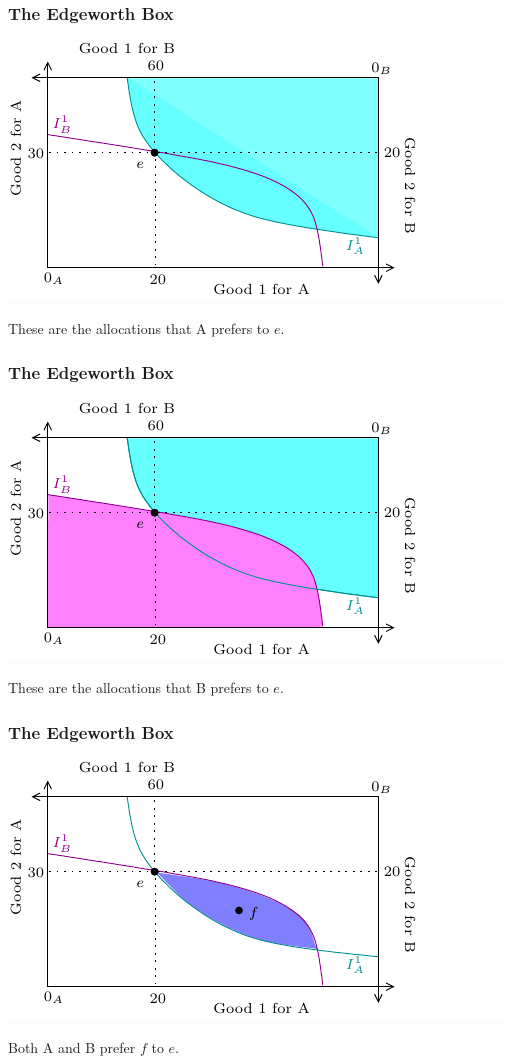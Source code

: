 \documentclass[xcolor=pdftex,dvipsnames]{beamer}
\begin{document}
\begin{frame}
\frametitle{The Edgeworth Box}
\begin{center}
\includegraphics{pics/Edgeworth5}
\end{center}
These are the allocations that A prefers to $e$.
\end{frame}

\begin{frame}
\frametitle{The Edgeworth Box}
\begin{center}
\includegraphics{pics/Edgeworth6}
\end{center}
These are the allocations that B prefers to $e$.
\end{frame}

\begin{frame}
\frametitle{The Edgeworth Box}
\begin{center}
\includegraphics{pics/Edgeworth7}
\end{center}
Both A and B prefer $f$ to $e$.
\end{frame}
\end{document}
